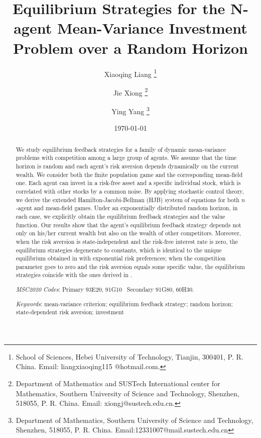 \documentclass[11pt]{article}
\newcommand \noi {\noindent}
\numberwithin{equation}{section}
\begin{document}
	\title{Equilibrium Strategies for the N-agent Mean-Variance Investment Problem over a Random Horizon}
	
	\author{Xiaoqing Liang%
		\thanks{School of Sciences, Hebei University of Technology, Tianjin, 300401, P. R. China. Email: liangxiaoqing115 \break @hotmail.com.}
		\and Jie Xiong%
		\thanks{Department of Mathematics and SUSTech International center for Mathematics, Southern University
			of Science and Technology, Shenzhen, 518055, P. R. China. Email: xiongj@sustech.edu.cn.}
		\and Ying Yang%
		\thanks{Department of Mathematics, Southern University
			of Science and Technology, Shenzhen, 518055, P. R. China. Email:12331007@mail.sustech.edu.cn}
	}
	\date{\today}
	\maketitle
	\begin{abstract}
		We study equilibrium feedback strategies for a family of dynamic mean-variance problems with competition among a large group of agents. We assume that the time horizon is random and each agent's risk aversion depends dynamically on the current wealth. We consider both the finite population game and the corresponding mean-field one. Each agent can invest in a risk-free asset and a specific individual stock, which is correlated with other stocks by a common noise. By applying stochastic control theory, we derive the extended Hamilton-Jacobi-Bellman (HJB) system of equations for both $n$-agent and mean-field games. Under an exponentially distributed random horizon, in each case, we explicitly obtain the equilibrium feedback strategies and the value function. Our results show that the agent's equilibrium feedback strategy depends not only on his/her current wealth but also on the wealth of other competitors. Moreover, when the risk aversion is state-independent and the risk-free interest rate is zero, the equilibrium strategies degenerate to constants, which is identical to the unique equilibrium obtained in \citet{lacker2019mean} with exponential risk preferences; when the competition parameter goes to zero and the risk aversion equals some specific value, the equilibrium strategies coincide with the ones derived in \citet{landriault2018equilibrium}.
		
		
		\medskip
		
		\noi \textit{MSC2020 Codes}: Primary 93E20, 91G10  \, Secondary  91G80, 60H30.
		
		
		\medskip
		
		\noi \textit{Keywords}: mean-variance criterion; equilibrium feedback strategy; random horizon; state-dependent risk aversion; investment
		
		
	\end{abstract}
	
\end{document}
